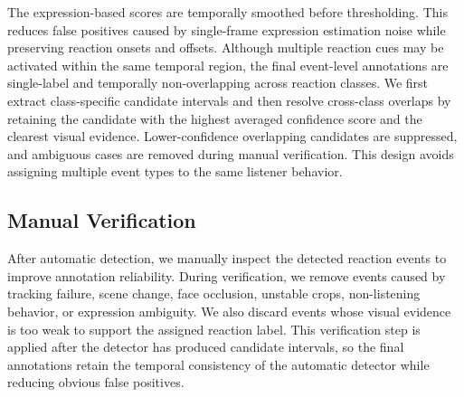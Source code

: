 The expression-based scores are temporally smoothed before thresholding. This reduces false positives caused by single-frame expression estimation noise while preserving reaction onsets and offsets. Although multiple reaction cues may be activated within the same temporal region, the final event-level annotations are single-label and temporally non-overlapping across reaction classes. We first extract class-specific candidate intervals and then resolve cross-class overlaps by retaining the candidate with the highest averaged confidence score and the clearest visual evidence. Lower-confidence overlapping candidates are suppressed, and ambiguous cases are removed during manual verification. This design avoids assigning multiple event types to the same listener behavior.

\subsection{Manual Verification}
\label{app:manual_verification}

After automatic detection, we manually inspect the detected reaction events to improve annotation reliability. During verification, we remove events caused by tracking failure, scene change, face occlusion, unstable crops, non-listening behavior, or expression ambiguity. We also discard events whose visual evidence is too weak to support the assigned reaction label. This verification step is applied after the detector has produced candidate intervals, so the final annotations retain the temporal consistency of the automatic detector while reducing obvious false positives.